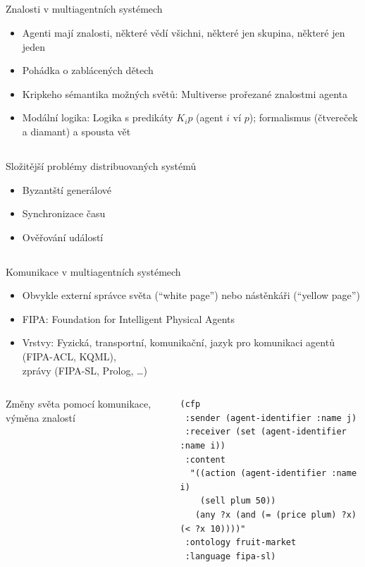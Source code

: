 \documentclass{beamer}
\begin{document}
\subsection{}
\begin{frame}{Znalosti v multiagentních systémech}
\begin{itemize}
\item Agenti mají znalosti, některé vědí všichni, některé jen skupina, některé jen jeden
\item Pohádka o zablácených dětech
\item Kripkeho sémantika možných světů: Multiverse prořezané znalostmi agenta
\item Modální logika: Logika s predikáty $K_i p$ (agent $i$ ví $p$);
	formalismus (čtvereček a diamant) a spousta vět
\end{itemize}
\end{frame}

\subsection{}
\begin{frame}{Složitější problémy distribuovaných systémů}
\begin{itemize}
\item Byzantští generálové
\item Synchronizace času
\item Ověřování událostí
\end{itemize}
\end{frame}

\subsection{}
\begin{frame}[fragile]{Komunikace v multiagentních systémech}
\begin{itemize}
\item Obvykle externí správce světa (``white page'') nebo nástěnkáři (``yellow page'')
\item FIPA: Foundation for Intelligent Physical Agents
\item Vrstvy: Fyzická, transportní, komunikační, jazyk pro komunikaci agentů (FIPA-ACL, KQML), \\ zprávy (FIPA-SL, Prolog, \dots)
\end{itemize}
\begin{columns}
\begin{column}{4cm}
Změny světa pomocí komunikace, výměna znalostí
\end{column}
\begin{column}[fragile]{7cm}
\begin{lstlisting}
(cfp
 :sender (agent-identifier :name j)
 :receiver (set (agent-identifier :name i))
 :content
  "((action (agent-identifier :name i)
    (sell plum 50))
   (any ?x (and (= (price plum) ?x) (< ?x 10))))"
 :ontology fruit-market
 :language fipa-sl)
\end{lstlisting}
\end{column}
\end{columns}
\end{frame}
\end{document}
